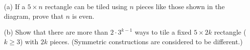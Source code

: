 (a) If a $5 \times n$ rectangle can be tiled using $n$ pieces like those shown in the diagram, prove that $n$ is even.

(b) Show that there are more than $2 \cdot 3^{k-1}$ ways to tile a fixed $5 \times 2k$ rectangle ($k \geq 3$) with $2k$ pieces. (Symmetric constructions are considered to be different.)
